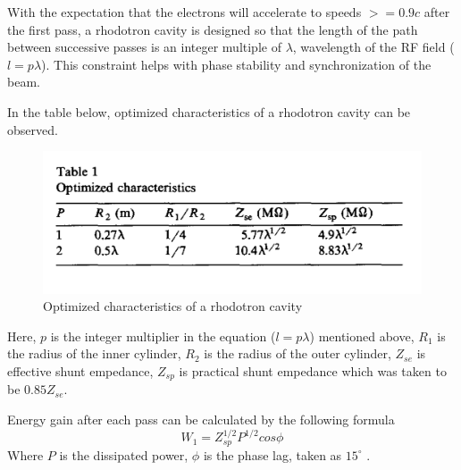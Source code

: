 \documentclass[a4paper,oneside,12pt]{report}
\numberwithin{equation}{chapter}
\begin{document}
With the expectation that the electrons will accelerate to speeds $>=0.9 c$ after the first pass, a rhodotron cavity is designed so that the length of the path between successive passes is an integer multiple of $\lambda$, wavelength of the RF field ($l=p\lambda \label{eq:lpl}$).
This constraint helps with  phase stability and synchronization of the beam.

In the table below, optimized characteristics of a rhodotron cavity can be observed. 
\begin{figure}[H]
    \centering
    \includegraphics[width=.9\textwidth]{./figures/pottier_table1.png}
    \caption{Optimized characteristics of a rhodotron cavity \cite{rhodo_pottier}}
    \label{fig:pottier_table1}
\end{figure}
Here, $p$ is the integer multiplier in the equation ($l=p\lambda$) mentioned above, $R_1$ is the radius of the inner cylinder, $R_2$ is the radius of the outer cylinder, 
$Z_{se}$ is effective shunt empedance, $Z_{sp}$ is practical shunt empedance which was taken to be $0.85 Z_{se}$.

Energy gain after each pass can be calculated by the following formula \cite{rhodo_pottier}
\begin{equation}
    \label{eq:W_gain_each_pass_pottier}
    W_1 = Z_{sp}^{1/2} P^{1/2} cos \phi  
\end{equation}
Where $P$ is the dissipated power, $\phi$ is the phase lag, taken as $15^\circ$ \cite{rhodo_pottier}. 
\end{document}
